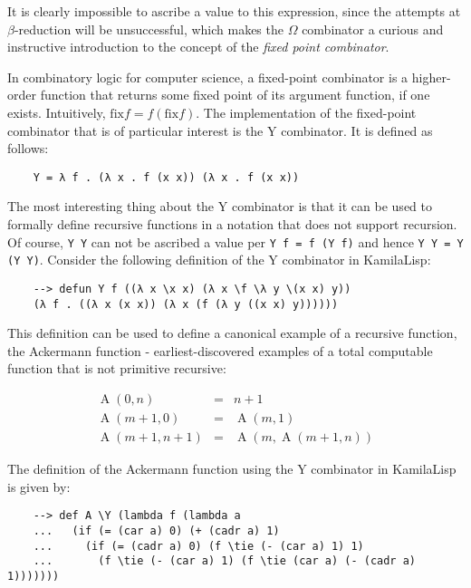 It is clearly impossible to ascribe a value to this expression, since the attempts at $\beta$-reduction will be unsuccessful, which makes the $\Omega$ combinator a curious and instructive introduction to the concept of the \textit{fixed point combinator}.

In combinatory logic for computer science, a fixed-point combinator is a higher-order function that returns some fixed point of its argument function, if one exists. Intuitively, $\text{fix} f = f (\text{fix} f)$. The implementation of the fixed-point combinator that is of particular interest is the Y combinator. It is defined as follows:

\begin{Verbatim}
    Y = λ f . (λ x . f (x x)) (λ x . f (x x))
\end{Verbatim}

The most interesting thing about the Y combinator is that it can be used to formally define recursive functions in a notation that does not support recursion. Of course, \verb|Y Y| can not be ascribed a value per \verb|Y f = f (Y f)| and hence \verb|Y Y = Y (Y Y)|. Consider the following definition of the Y combinator in KamilaLisp:

\begin{Verbatim}
    --> defun Y f ((λ x \x x) (λ x \f \λ y \(x x) y))
    (λ f . ((λ x (x x)) (λ x (f (λ y ((x x) y))))))
\end{Verbatim}

This definition can be used to define a canonical example of a recursive function, the Ackermann function - earliest-discovered examples of a total computable function that is not primitive recursive:

$$
\begin{array}{lcl}
    \operatorname {A} (0,n)&=&n+1\\
    \operatorname {A} (m+1,0)&=&\operatorname {A} (m,1)\\
    \operatorname {A} (m+1,n+1)&=&\operatorname {A} (m,\operatorname {A} (m+1,n))
\end{array}
$$

The definition of the Ackermann function using the Y combinator in KamilaLisp is given by:

\begin{Verbatim}
    --> def A \Y (lambda f (lambda a
    ...   (if (= (car a) 0) (+ (cadr a) 1)
    ...     (if (= (cadr a) 0) (f \tie (- (car a) 1) 1)
    ...       (f \tie (- (car a) 1) (f \tie (car a) (- (cadr a) 1)))))))
\end{Verbatim}

